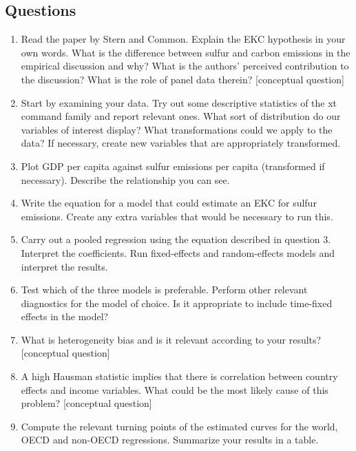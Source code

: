 \documentclass{scrartcl}
\begin{document}
	\subsection*{Questions}
	
	\begin{enumerate}
	\item Read the paper by Stern and Common. Explain the EKC hypothesis in your own words. What is the difference between sulfur and carbon emissions in the empirical discussion and why? What is the authors' perceived contribution to the discussion? What is the role of panel data therein? [conceptual question]
		
	\item Start by examining your data. Try out some descriptive statistics of the xt command family and report relevant ones. What sort of distribution do our variables of interest display? What transformations could we apply to the data? If necessary, create new variables that are appropriately transformed.
	
	\item Plot GDP per capita against sulfur emissions per capita (transformed if necessary). Describe the relationship you can see.
	
	\item Write the equation for a model that could estimate an EKC for sulfur emissions. Create any extra variables that would be necessary to run this.
	
	\item Carry out a pooled regression using the equation described in question 3. Interpret the coefficients. Run fixed-effects and random-effects models and interpret the results.
	
	\item Test which of the three models is preferable. Perform other relevant diagnostics for the model of choice. Is it appropriate to include time-fixed effects in the model?
	
	\item What is heterogeneity bias and is it relevant according to your results? [conceptual question]
	
	\item A high Hausman statistic implies that there is correlation between country effects and income variables. What could be the most likely cause of this problem? [conceptual question]
		
	\item Compute the relevant turning points of the estimated curves for the world, OECD and non-OECD regressions. Summarize your results in a table.
		

\end{enumerate}
\end{document}
